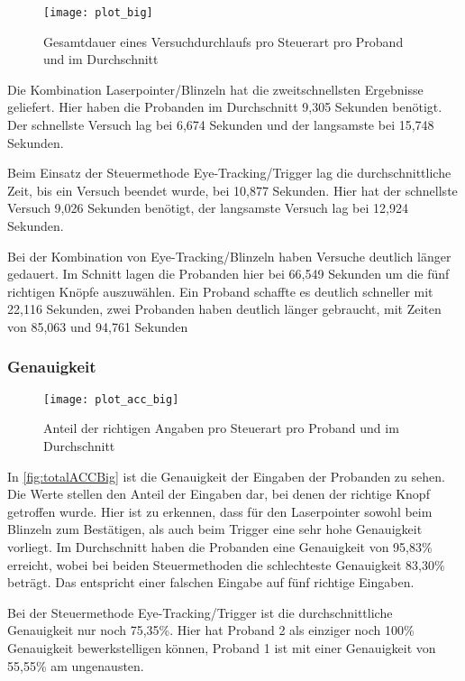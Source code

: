 \begin{figure}[!htbp]
	\centering
	\texttt{[image: plot\_big]}
	\caption[Gesamtdauer eines Versuchdurchlaufs pro Steuerart pro Proband und im Durchschnitt]{Gesamtdauer eines Versuchdurchlaufs pro Steuerart pro Proband und im Durchschnitt}
	\label{fig:totalTimesBig}
\end{figure}

Die Kombination Laserpointer/Blinzeln hat die zweitschnellsten Ergebnisse geliefert. Hier haben die Probanden im Durchschnitt 9,305 Sekunden benötigt. Der schnellste Versuch lag bei 6,674 Sekunden und der langsamste bei 15,748 Sekunden. 

Beim Einsatz der Steuermethode Eye-Tracking/Trigger lag die durchschnittliche Zeit, bis ein Versuch beendet wurde, bei 10,877 Sekunden. Hier hat der schnellste Versuch 9,026 Sekunden benötigt, der langsamste Versuch lag bei 12,924 Sekunden.

Bei der Kombination von Eye-Tracking/Blinzeln haben Versuche deutlich länger gedauert. Im Schnitt lagen die Probanden hier bei 66,549 Sekunden um die fünf richtigen Knöpfe auszuwählen. Ein Proband schaffte es deutlich schneller mit 22,116 Sekunden, zwei Probanden haben deutlich länger gebraucht, mit Zeiten von 85,063 und 94,761 Sekunden

\subsubsection{Genauigkeit}

\begin{figure}[!htbp]
	\centering
	\texttt{[image: plot\_acc\_big]}
	\caption[Anteil der richtigen Angaben pro Steuerart pro Proband und im Durchschnitt]{Anteil der richtigen Angaben pro Steuerart pro Proband und im Durchschnitt}
	\label{fig:totalACCBig}
\end{figure}
In \autoref{fig:totalACCBig} ist die Genauigkeit der Eingaben der Probanden zu sehen. Die Werte stellen den Anteil der Eingaben dar, bei denen der richtige Knopf getroffen wurde. Hier ist zu erkennen, dass  für den Laserpointer sowohl beim Blinzeln zum Bestätigen, als auch beim Trigger eine sehr hohe Genauigkeit vorliegt. Im Durchschnitt haben die Probanden eine Genauigkeit von 95,83\% erreicht, wobei bei beiden Steuermethoden die schlechteste Genauigkeit 83,30\% beträgt. Das entspricht einer falschen Eingabe auf fünf richtige Eingaben.

Bei der Steuermethode Eye-Tracking/Trigger ist die durchschnittliche Genauigkeit nur noch 75,35\%. Hier hat Proband 2 als einziger noch 100\% Genauigkeit bewerkstelligen können, Proband 1 ist mit einer Genauigkeit von 55,55\% am ungenausten. 

